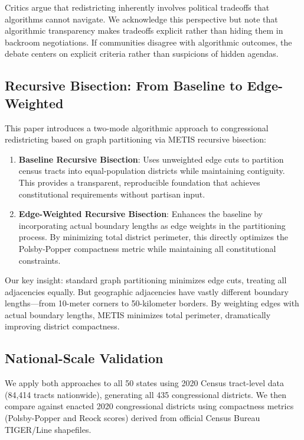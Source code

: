 Critics argue that redistricting inherently involves political tradeoffs that algorithms cannot navigate. We acknowledge this perspective but note that algorithmic transparency makes tradeoffs explicit rather than hiding them in backroom negotiations. If communities disagree with algorithmic outcomes, the debate centers on explicit criteria rather than suspicions of hidden agendas.

\subsection{Recursive Bisection: From Baseline to Edge-Weighted}

This paper introduces a two-mode algorithmic approach to congressional redistricting based on graph partitioning via METIS recursive bisection:

\begin{enumerate}
\item \textbf{Baseline Recursive Bisection}: Uses unweighted edge cuts to partition census tracts into equal-population districts while maintaining contiguity. This provides a transparent, reproducible foundation that achieves constitutional requirements without partisan input.

\item \textbf{Edge-Weighted Recursive Bisection}: Enhances the baseline by incorporating actual boundary lengths as edge weights in the partitioning process. By minimizing total district perimeter, this directly optimizes the Polsby-Popper compactness metric while maintaining all constitutional constraints.
\end{enumerate}

Our key insight: standard graph partitioning minimizes edge cuts, treating all adjacencies equally. But geographic adjacencies have vastly different boundary lengths—from 10-meter corners to 50-kilometer borders. By weighting edges with actual boundary lengths, METIS minimizes total perimeter, dramatically improving district compactness.

\subsection{National-Scale Validation}

We apply both approaches to all 50 states using 2020 Census tract-level data (84,414 tracts nationwide), generating all 435 congressional districts. We then compare against enacted 2020 congressional districts using compactness metrics (Polsby-Popper and Reock scores) derived from official Census Bureau TIGER/Line shapefiles.

